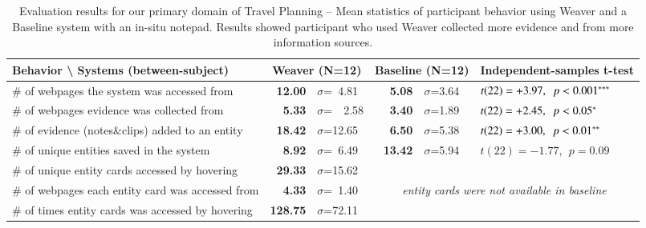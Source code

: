 \begin{table}
  \centering
  \scriptsize
  \begin{tabular}{ l  r l   r l l }
  
	
    \textbf{ Behavior {\textbackslash} Systems} {\scriptsize(between-subject)} &
    	\multicolumn{2}{c}{\textbf{Weaver {\scriptsize(N=12)}}} &
    	\multicolumn{2}{c}{\textbf{Baseline {\scriptsize(N=12)}}} & \textbf{Independent-samples t-test}
    	\\
	
	\hline
	
	\# of webpages the system was accessed from &
    \textbf{12.00} & $\sigma$=~4.81 &
    \textbf{5.08} & $\sigma$=3.64 &
    $t(22)=+3.97,~~p < 0.001^{\tiny***}$ \\
    
	\# of webpages evidence was collected from &
    \textbf{5.33} & $\sigma$=~~2.58 &
    \textbf{3.40} & $\sigma$=1.89 &
    $t(22)=+2.45,~~p < 0.05^{\tiny*}$\\
    
    
	\# of evidence (notes{\&}clips) added to an entity &
    \textbf{18.42} & $\sigma$=12.65 &
    \textbf{6.50} & $\sigma$=5.38 &
    $t(22)=+3.00,~~p < 0.01^{\tiny**}$\\
    
    
	\# of unique entities saved in the system &
    \textbf{8.92}  & $\sigma$=~6.49 &
    \textbf{13.42} & $\sigma$=5.94 &
    $t(22)=-1.77,~~p=0.09$\\
    
    \hdashline[1pt/1pt]

    
	\# of unique entity cards accessed by hovering &
    \textbf{29.33} & $\sigma$=15.62 &
    \multicolumn{3}{c}{\textit{}}
    \\
    \# of webpages each entity card was accessed from &
    \textbf{4.33} & $\sigma$=~1.40 &
    \multicolumn{3}{c}{\textit{entity cards were not available in baseline}}
    \\
	\# of times entity cards was accessed by hovering &
    \textbf{128.75} & $\sigma$=72.11 &
    \multicolumn{2}{c}{\textit{}}
    \\
    
	
	\hline
	
  \end{tabular}
  \caption[Evaluation results showed participants who used Weaver collected more evidence from more sources.]{Evaluation results for our primary domain of Travel Planning -- Mean statistics of participant behavior using Weaver and a Baseline system with an in-situ notepad. Results showed participant who used Weaver collected more evidence and from more information sources.}
  \label{tab:results_main}
\end{table}